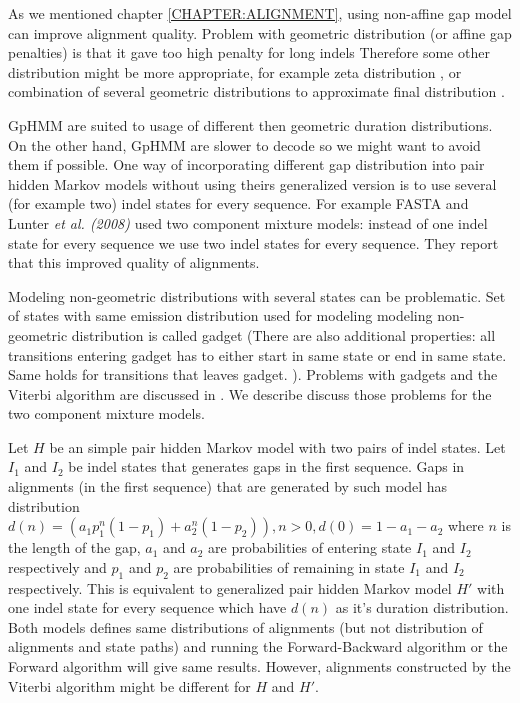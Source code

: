 As we mentioned chapter \ref{CHAPTER:ALIGNMENT}, using non-affine gap model can
improve alignment quality.  Problem with geometric distribution (or affine gap
penalties) is that it gave too high penalty for long indels \cite{} Therefore
some other distribution might be more appropriate, for example zeta distribution
\cite{}, or combination of several geometric distributions to approximate final
distribution \cite{}.

GpHMM are suited to usage of different then geometric duration distributions.
On the other hand, GpHMM are slower to decode so we might want to avoid them if
possible.  One way of incorporating different gap distribution into pair hidden
Markov models without using theirs generalized version is to use several (for
example two) indel states for every sequence. For example FASTA \cite{} and
Lunter {\it et al. (2008)} used two component mixture models: instead of one
indel state for every sequence we use two indel states for every sequence. They
report that this improved quality of alignments.

Modeling non-geometric distributions with several states can be problematic. Set
of states with same emission distribution used for modeling modeling
non-geometric distribution is called gadget (There are also additional
properties: all transitions entering gadget has to either start in same state or
end in same state. Same holds for transitions that leaves gadget. ). Problems
with gadgets and the Viterbi algorithm are discussed in
\cite{TomasovaDizertacka}. We describe discuss those problems for the two
component mixture models.

Let $H$ be an simple pair hidden Markov model with two pairs of indel states.
Let $I_1$ and $I_2$ be indel states that generates gaps in the first sequence.
Gaps in alignments (in the first sequence) that are generated by such model has
distribution $d(n)=(a_1p_1^n(1-p_1)+a_2^n(1-p_2)), n>0, d(0)=1-a_1-a_2$ where
$n$ is the length of the gap, $a_1$ and $a_2$ are probabilities of entering
state $I_1$ and $I_2$ respectively and $p_1$ and $p_2$ are probabilities of
remaining in state $I_1$ and $I_2$ respectively. This is equivalent to
generalized pair hidden Markov model $H'$ with one indel state for every
sequence which have $d(n)$ as it's duration distribution. Both models defines
same distributions of alignments (but not distribution of alignments and state
paths) and running the Forward-Backward algorithm or the Forward algorithm will 
give same results. However, alignments constructed by the Viterbi algorithm
might be different for $H$ and $H'$.

